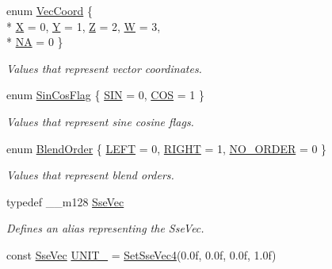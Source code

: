 \begin{DoxyCompactItemize}
\item 
enum \hyperlink{namespacegfxmath_a8930e63e96e91796ede30a8378b19d0b}{Vec\+Coord} \{ \\*
\hyperlink{namespacegfxmath_a8930e63e96e91796ede30a8378b19d0bad0d09e689002558ad9843a534c0be86e}{X} = 0, 
\hyperlink{namespacegfxmath_a8930e63e96e91796ede30a8378b19d0badd0e5340138dca954913bc9378f1c228}{Y} = 1, 
\hyperlink{namespacegfxmath_a8930e63e96e91796ede30a8378b19d0ba15f9e08071113483f5106cf0ba08e502}{Z} = 2, 
\hyperlink{namespacegfxmath_a8930e63e96e91796ede30a8378b19d0ba9589e88a1f2f02c189304aab6a2629f2}{W} = 3, 
\\*
\hyperlink{namespacegfxmath_a8930e63e96e91796ede30a8378b19d0baa2f2f53ce2dc4111dbf16ba3d31692f7}{N\+A} = 0
 \}
\begin{DoxyCompactList}\small\item\em Values that represent vector coordinates. \end{DoxyCompactList}\item 
enum \hyperlink{namespacegfxmath_ac97be114298a04e9db7f993085667b00}{Sin\+Cos\+Flag} \{ \hyperlink{namespacegfxmath_ac97be114298a04e9db7f993085667b00ac25dc94e5f333f4dc6ead2b93687bfcc}{S\+I\+N} = 0, 
\hyperlink{namespacegfxmath_ac97be114298a04e9db7f993085667b00a46197a43f8fe8efbdae8c2670975d2e7}{C\+O\+S} = 1
 \}
\begin{DoxyCompactList}\small\item\em Values that represent sine cosine flags. \end{DoxyCompactList}\item 
enum \hyperlink{namespacegfxmath_ac03f836d004dbed0f2219c54b8e63e3d}{Blend\+Order} \{ \hyperlink{namespacegfxmath_ac03f836d004dbed0f2219c54b8e63e3da48d2a91c97bb0e96285fd218fbd098f5}{L\+E\+F\+T} = 0, 
\hyperlink{namespacegfxmath_ac03f836d004dbed0f2219c54b8e63e3da28dcb685e33dd6cc73f168dbf003894e}{R\+I\+G\+H\+T} = 1, 
\hyperlink{namespacegfxmath_ac03f836d004dbed0f2219c54b8e63e3da631e9eab7013501bd492e4730e793d27}{N\+O\+\_\+\+O\+R\+D\+E\+R} = 0
 \}
\begin{DoxyCompactList}\small\item\em Values that represent blend orders. \end{DoxyCompactList}\item 
typedef \+\_\+\+\_\+m128 \hyperlink{namespacegfxmath_a0de2243e2b8d0fd46d3af5e036423004}{Sse\+Vec}
\begin{DoxyCompactList}\small\item\em Defines an alias representing the Sse\+Vec. \end{DoxyCompactList}\item 
\hypertarget{namespacegfxmath_a6994d7f14c150c61f588662f00d0c8ff}{}const \hyperlink{namespacegfxmath_a0de2243e2b8d0fd46d3af5e036423004}{Sse\+Vec} \hyperlink{namespacegfxmath_a6994d7f14c150c61f588662f00d0c8ff}{U\+N\+I\+T\+\_} = \hyperlink{namespacegfxmath_a3b21a4362c6ac781c5f6ab922840ba77}{Set\+Sse\+Vec4}(0.\+0f, 0.\+0f, 0.\+0f, 1.\+0f)\label{namespacegfxmath_a6994d7f14c150c61f588662f00d0c8ff}


\end{DoxyCompactItemize}
